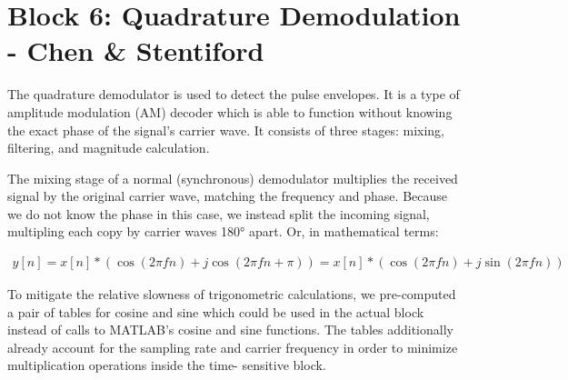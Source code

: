 
\section{Block 6: Quadrature Demodulation - Chen & Stentiford}

The quadrature demodulator is used to detect the pulse envelopes. It is a type of 
amplitude modulation (AM) decoder which is able to function without knowing the exact 
phase of the signal's carrier wave. It consists of three stages: mixing, filtering, 
and magnitude calculation.

The mixing stage of a normal (synchronous) demodulator multiplies the received signal 
by the original carrier wave, matching the frequency and phase. Because we do not know 
the phase in this case, we instead split the incoming signal, multipling each copy by 
carrier waves 180° apart. Or, in mathematical terms:

\begin{align*}
    y[n] = x[n]*(\cos(2 \pi f n)+j \cos(2 \pi f n+\pi)) = x[n]*(\cos(2 \pi f n)+j \sin(2 \pi f n))
\end{align*}

To mitigate the relative slowness of trigonometric calculations, we pre-computed a pair of 
tables for cosine and sine which could be used in the actual block instead of calls to 
MATLAB's cosine and sine functions. The tables additionally already account for the sampling 
rate and carrier frequency in order to minimize multiplication operations inside the time-
sensitive block.